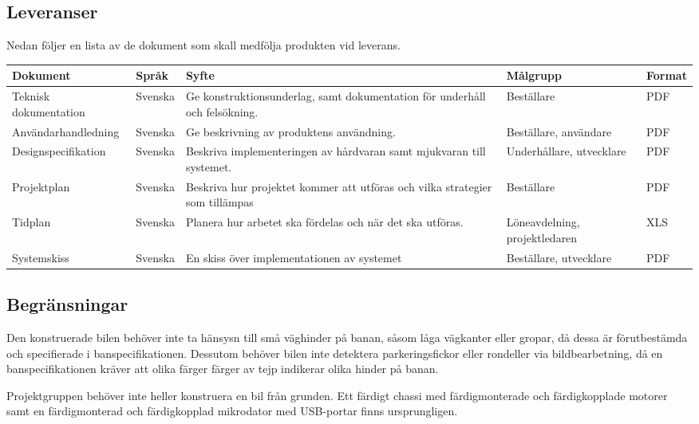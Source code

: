 \documentclass[projektplan/plan.tex]{subfiles}
\begin{document}
\noindent
\begin{minipage}{\textwidth}
\subsection{Leveranser}
\label{sec:doc}
Nedan följer en lista av de dokument som skall medfölja produkten vid leverans.
{\renewcommand{\arraystretch}{1.6}
\begin{longtable}{p{4.5cm}p{1.5cm}p{5cm}p{2.2cm}p{1.2cm}}
    \bfseries Dokument &
    \bfseries Språk &
    \bfseries Syfte &
    \bfseries Målgrupp &
    \bfseries Format \\\hline
    Teknisk dokumentation &
    Svenska &
    Ge konstruktionsunderlag, samt dokumentation för underhåll och
    felsökning. &
    Beställare &
    PDF
    \\
    Användarhandledning &
    Svenska &
    Ge beskrivning av produktens användning. &
    Beställare, användare &
    PDF
    \\
    Designspecifikation &
    Svenska &
    Beskriva implementeringen av hårdvaran samt mjukvaran till systemet. &
    Underhållare, utvecklare &
    PDF
    \\
    Projektplan &
    Svenska &
    Beskriva hur projektet kommer att utföras och vilka strategier som
    tillämpas &
    Beställare &
    PDF
    \\
    Tidplan &
    Svenska &
    Planera hur arbetet ska fördelas och när det ska utföras. &
    Löne\-avdelning, projekt\-ledaren &
    XLS
    \\
    Systemskiss &
    Svenska &
    En skiss över implementationen av systemet &
    Beställare, utvecklare &
    PDF
    \\
    
    \endhead
\end{longtable}}
\end{minipage}

\subsection{Begränsningar}
Den konstruerade bilen behöver inte ta hänsysn till små väghinder på banan,
såsom låga vägkanter eller gropar, då dessa är förutbestämda och specifierade i
banspecifikationen. Dessutom behöver bilen inte detektera parkeringsfickor
eller rondeller via bildbearbetning, då en banspecifikationen kräver att olika
färger färger av tejp indikerar olika hinder på banan.

Projektgruppen behöver inte heller konstruera en bil från grunden. Ett färdigt
chassi med färdigmonterade och färdigkopplade motorer samt en färdigmonterad
och färdigkopplad mikrodator med USB-portar finns ursprungligen.
\end{document}
